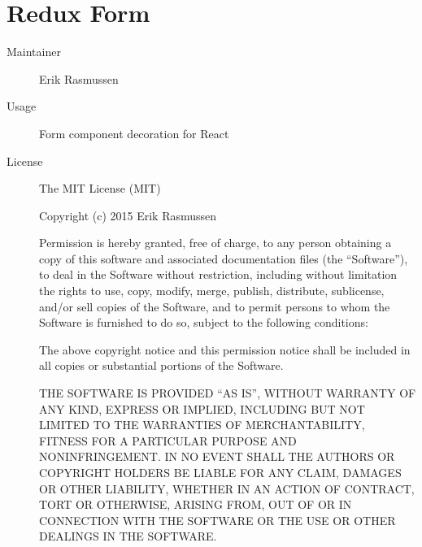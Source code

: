   \section*{Redux Form}
    \begin{description}
      \item[Maintainer] Erik Rasmussen
      \item[Usage] Form component decoration for React
      \item[License] \scriptsize The MIT License (MIT)

        Copyright (c) 2015 Erik Rasmussen

        Permission is hereby granted, free of charge, to any person obtaining a copy
        of this software and associated documentation files (the ``Software''), to deal
        in the Software without restriction, including without limitation the rights
        to use, copy, modify, merge, publish, distribute, sublicense, and/or sell
        copies of the Software, and to permit persons to whom the Software is
        furnished to do so, subject to the following conditions:

        The above copyright notice and this permission notice shall be included in all
        copies or substantial portions of the Software.

        THE SOFTWARE IS PROVIDED ``AS IS'', WITHOUT WARRANTY OF ANY KIND, EXPRESS OR
        IMPLIED, INCLUDING BUT NOT LIMITED TO THE WARRANTIES OF MERCHANTABILITY,
        FITNESS FOR A PARTICULAR PURPOSE AND NONINFRINGEMENT. IN NO EVENT SHALL THE
        AUTHORS OR COPYRIGHT HOLDERS BE LIABLE FOR ANY CLAIM, DAMAGES OR OTHER
        LIABILITY, WHETHER IN AN ACTION OF CONTRACT, TORT OR OTHERWISE, ARISING FROM,
        OUT OF OR IN CONNECTION WITH THE SOFTWARE OR THE USE OR OTHER DEALINGS IN THE
        SOFTWARE.
    \end{description}


